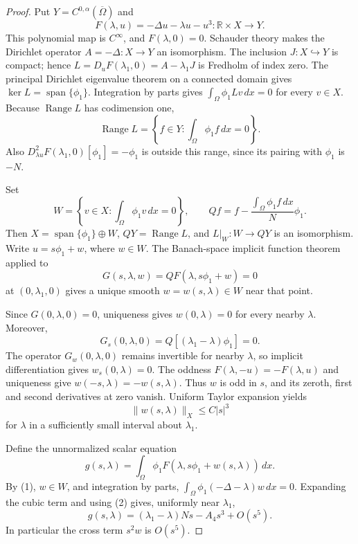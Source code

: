 \documentclass[11pt]{article}
\begin{document}
\begin{proof}
Put \(Y=C^{0,\alpha}(\overline\Omega)\) and
\[
 F(\lambda,u)=-\Delta u-\lambda u-u^3:
       \mathbb R\times X\longrightarrow Y.
\]
This polynomial map is \(C^\infty\), and \(F(\lambda,0)=0\).
Schauder theory makes the Dirichlet operator
\(A=-\Delta:X\to Y\) an isomorphism. The inclusion
\(J:X\hookrightarrow Y\) is compact; hence
\(L=D_uF(\lambda_1,0)=A-\lambda_1J\) is Fredholm of index zero.
The principal Dirichlet eigenvalue theorem on a connected domain gives
\(\ker L=\operatorname{span}\{\phi_1\}\).
Integration by parts gives
\(\int_\Omega\phi_1 Lv\,dx=0\) for every \(v\in X\).
Because \(\operatorname{Range}L\) has codimension one,
\[
 \operatorname{Range}L
 =\left\{f\in Y:\int_\Omega\phi_1 f\,dx=0\right\}. \tag{1}
\]
Also \(D_{\lambda u}^2F(\lambda_1,0)[\phi_1]=-\phi_1\) is outside
this range, since its pairing with \(\phi_1\) is \(-N\).

Set
\[
 W=\left\{v\in X:\int_\Omega\phi_1v\,dx=0\right\},\qquad
 Qf=f-\frac{\int_\Omega\phi_1f\,dx}{N}\phi_1.
\]
Then \(X=\operatorname{span}\{\phi_1\}\oplus W\),
\(QY=\operatorname{Range}L\), and \(L|_W:W\to QY\) is an
isomorphism. Write \(u=s\phi_1+w\), where \(w\in W\).
The Banach-space implicit function theorem applied to
\[
 G(s,\lambda,w)=QF(\lambda,s\phi_1+w)=0
\]
at \((0,\lambda_1,0)\) gives a unique smooth
\(w=w(s,\lambda)\in W\) near that point.

Since \(G(0,\lambda,0)=0\), uniqueness gives
\(w(0,\lambda)=0\) for every nearby \(\lambda\). Moreover,
\[
 G_s(0,\lambda,0)
 =Q[(\lambda_1-\lambda)\phi_1]=0.
\]
The operator \(G_w(0,\lambda,0)\) remains invertible for nearby
\(\lambda\), so implicit differentiation gives
\(w_s(0,\lambda)=0\). The oddness
\(F(\lambda,-u)=-F(\lambda,u)\) and uniqueness give
\(w(-s,\lambda)=-w(s,\lambda)\). Thus \(w\) is odd in \(s\),
and its zeroth, first and second derivatives at zero vanish.
Uniform Taylor expansion yields
\[
 \|w(s,\lambda)\|_X\le C|s|^3                       \tag{2}
\]
for \(\lambda\) in a sufficiently small interval about \(\lambda_1\).

Define the unnormalized scalar equation
\[
 g(s,\lambda)
 =\int_\Omega\phi_1F(\lambda,s\phi_1+w(s,\lambda))\,dx.
\]
By (1), \(w\in W\), and integration by parts,
\(\int_\Omega\phi_1(-\Delta-\lambda)w\,dx=0\).
Expanding the cubic term and using (2) gives, uniformly near
\(\lambda_1\),
\[
 g(s,\lambda)
 =(\lambda_1-\lambda)Ns-A_4s^3+O(s^5).          \tag{3}
\]
In particular the cross term \(s^2w\) is \(O(s^5)\).


\end{proof}
\end{document}
